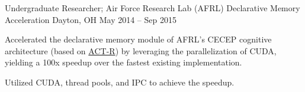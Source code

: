 \begin{cventries}

\cventry
{Undergraduate Researcher; Air Force Research Lab (AFRL)}
{Declarative Memory Acceleration}
{Dayton, OH}
{May 2014 – Sep 2015}
{
\begin{cvitems}
\item Accelerated the declarative memory module of AFRL's CECEP cognitive architecture (based on \href{http://act-r.psy.cmu.edu/}{ACT-R}) by leveraging the parallelization of CUDA, yielding a 100x speedup over the fastest existing implementation.
\item Utilized CUDA, thread pools, and IPC to achieve the speedup.
\end{cvitems}
}


\end{cventries}